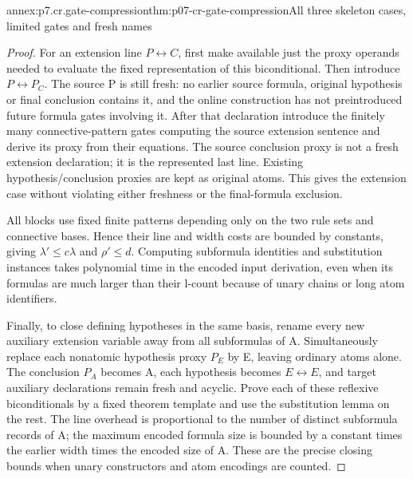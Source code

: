 \begin{annexitem}{annex:p7.cr.gate-compression}{thm:p07-cr-gate-compression}{All three skeleton cases, limited gates and fresh names}
\begin{proof}
For an extension line \(P\leftrightarrow C\), first make
available just the proxy operands needed to evaluate the fixed
representation of this biconditional. Then introduce
\(P\leftrightarrow P_C\). The source P is still fresh:
no earlier source formula, original hypothesis or final conclusion
contains it, and the online construction has not preintroduced
future formula gates involving it. After that declaration introduce
the finitely many connective-pattern gates computing the source
extension sentence and derive its proxy from their equations.
The source conclusion proxy is not a fresh extension declaration;
it is the represented last line. Existing hypothesis/conclusion
proxies are kept as original atoms. This gives the extension case
without violating either freshness or the final-formula exclusion.

All blocks use fixed finite patterns depending only on the two
rule sets and connective bases. Hence their line and width costs
are bounded by constants, giving \(\lambda'\leq c\lambda\)
and \(\rho'\leq d\). Computing subformula identities and
substitution instances takes polynomial time in the encoded
input derivation, even when its formulas are much larger than
their l-count because of unary chains or long atom identifiers.

Finally, to close defining hypotheses in the same basis, rename
every new auxiliary extension variable away from all subformulas
of A. Simultaneously replace each nonatomic hypothesis proxy
\(P_E\) by E, leaving ordinary atoms alone. The conclusion
\(P_A\) becomes A, each hypothesis becomes
\(E\leftrightarrow E\), and target auxiliary declarations remain
fresh and acyclic. Prove each of these reflexive biconditionals
by a fixed theorem template and use the substitution lemma on
the rest. The line overhead is proportional to the number of
distinct subformula records of A; the maximum encoded formula
size is bounded by a constant times the earlier width times
the encoded size of A. These are the precise closing bounds
when unary constructors and atom encodings are counted.
\end{proof}
\end{annexitem}

